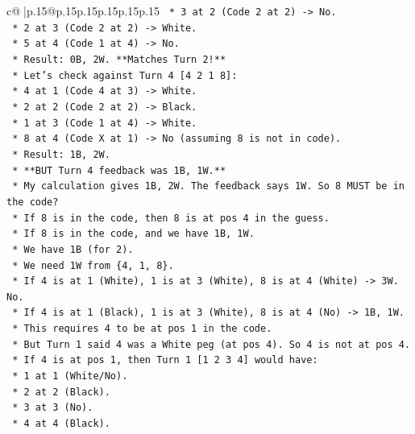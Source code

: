 \documentclass{article}
\begin{document}
{\begin{supertabular}{c@{$\;$}|p{.15\linewidth}@{}p{.15\linewidth}p{.15\linewidth}p{.15\linewidth}p{.15\linewidth}p{.15\linewidth}}
{{{\texttt{            *   3 at 2 (Code 2 at 2) {-}> No.} \\
\texttt{            *   2 at 3 (Code 2 at 2) {-}> White.} \\
\texttt{            *   5 at 4 (Code 1 at 4) {-}> No.} \\
\texttt{            *   Result: 0B, 2W. **Matches Turn 2!**} \\
\texttt{        *   Let's check against Turn 4 {[}4 2 1 8{]}:} \\
\texttt{            *   4 at 1 (Code 4 at 3) {-}> White.} \\
\texttt{            *   2 at 2 (Code 2 at 2) {-}> Black.} \\
\texttt{            *   1 at 3 (Code 1 at 4) {-}> White.} \\
\texttt{            *   8 at 4 (Code X at 1) {-}> No (assuming 8 is not in code).} \\
\texttt{            *   Result: 1B, 2W.} \\
\texttt{            *   **BUT Turn 4 feedback was 1B, 1W.**} \\
\texttt{            *   My calculation gives 1B, 2W. The feedback says 1W. So 8 MUST be in the code?} \\
\texttt{            *   If 8 is in the code, then 8 is at pos 4 in the guess.} \\
\texttt{            *   If 8 is in the code, and we have 1B, 1W.} \\
\texttt{            *   We have 1B (for 2).} \\
\texttt{            *   We need 1W from \{4, 1, 8\}.} \\
\texttt{            *   If 4 is at 1 (White), 1 is at 3 (White), 8 is at 4 (White) {-}> 3W. No.} \\
\texttt{            *   If 4 is at 1 (Black), 1 is at 3 (White), 8 is at 4 (No) {-}> 1B, 1W.} \\
\texttt{            *   This requires 4 to be at pos 1 in the code.} \\
\texttt{            *   But Turn 1 said 4 was a White peg (at pos 4). So 4 is not at pos 4.} \\
\texttt{            *   If 4 is at pos 1, then Turn 1 {[}1 2 3 4{]} would have:} \\
\texttt{                *   1 at 1 (White/No).} \\
\texttt{                *   2 at 2 (Black).} \\
\texttt{                *   3 at 3 (No).} \\
\texttt{                *   4 at 4 (Black).} \\
}}}
\end{supertabular}}
\end{document}
